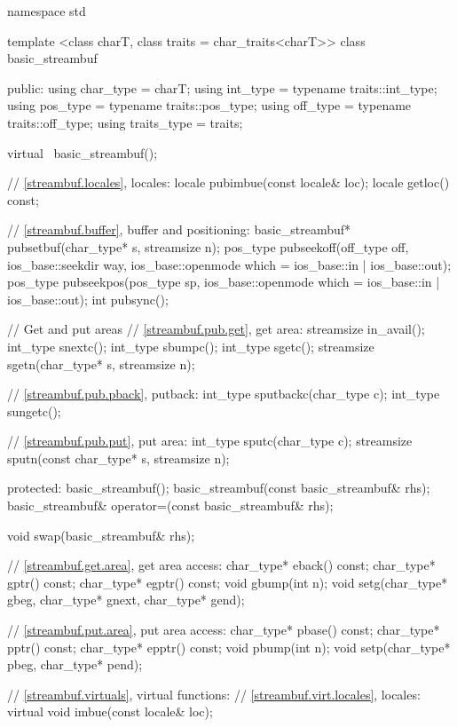%
\begin{codeblock}
namespace std {
  template <class charT, class traits = char_traits<charT>>
  class basic_streambuf {
  public:
    using char_type   = charT;
    using int_type    = typename traits::int_type;
    using pos_type    = typename traits::pos_type;
    using off_type    = typename traits::off_type;
    using traits_type = traits;

    virtual ~basic_streambuf();

    // \ref{streambuf.locales}, locales:
    locale   pubimbue(const locale& loc);
    locale   getloc() const;

    // \ref{streambuf.buffer}, buffer and positioning:
    basic_streambuf* pubsetbuf(char_type* s, streamsize n);
    pos_type pubseekoff(off_type off, ios_base::seekdir way,
                        ios_base::openmode which
                          = ios_base::in | ios_base::out);
    pos_type pubseekpos(pos_type sp,
                        ios_base::openmode which
                          = ios_base::in | ios_base::out);
    int      pubsync();

    // Get and put areas
    // \ref{streambuf.pub.get}, get area:
    streamsize in_avail();
    int_type snextc();
    int_type sbumpc();
    int_type sgetc();
    streamsize sgetn(char_type* s, streamsize n);

    // \ref{streambuf.pub.pback}, putback:
    int_type sputbackc(char_type c);
    int_type sungetc();

    // \ref{streambuf.pub.put}, put area:
    int_type   sputc(char_type c);
    streamsize sputn(const char_type* s, streamsize n);

  protected:
    basic_streambuf();
    basic_streambuf(const basic_streambuf& rhs);
    basic_streambuf& operator=(const basic_streambuf& rhs);

    void swap(basic_streambuf& rhs);

    // \ref{streambuf.get.area}, get area access:
    char_type* eback() const;
    char_type* gptr()  const;
    char_type* egptr() const;
    void       gbump(int n);
    void       setg(char_type* gbeg, char_type* gnext, char_type* gend);

    // \ref{streambuf.put.area}, put area access:
    char_type* pbase() const;
    char_type* pptr() const;
    char_type* epptr() const;
    void       pbump(int n);
    void       setp(char_type* pbeg, char_type* pend);

    // \ref{streambuf.virtuals}, virtual functions:
    // \ref{streambuf.virt.locales}, locales:
    virtual void imbue(const locale& loc);

}}
\end{codeblock}
